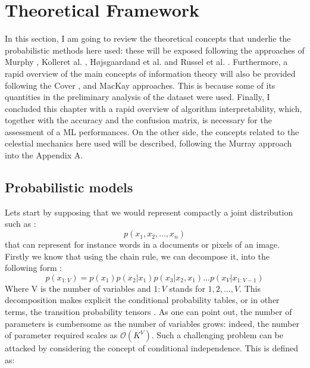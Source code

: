 \documentclass[12pt,%
               a4paper,%
               oneside,openany,%
               titlepage,%
               headinclude,footinclude,%
               BCOR5mm,%
               cleardoublepage=empty,%
               tablecaptionabove,%
               floatperchapter,
               ]{scrreprt}                 %
\begin{document}
 


\chapter{Theoretical Framework}

In this section, I am going to review the theoretical concepts
that underlie the probabilistic methods here used: these will be
exposed following the approaches of Murphy \cite{murphy2012machine} , Kolleret al. \cite{koller2009probabilistic}, Højsgaardand et al. \cite{hojsgaard2012graphical} and Russel et al. \cite{russell2010artificial}. Furthermore, a rapid overview of the main concepts of information theory will also be provided following the Cover \cite{cover2006elements}, and MacKay \cite{mackay2003information} approaches. This is because some of its quantities in the preliminary analysis of the dataset were used. Finally, I concluded this chapter with a rapid overview of algorithm interpretability, which, together with the accuracy and the
confusion matrix, is necessary for the assessment of a ML performances. On the other side, the concepts related to the celestial
mechanics here used will be described, following the Murray
approach \cite{murray1999solar} into the Appendix A.

\section{Probabilistic models}

Lets start by supposing that we would represent compactly a joint distribution such as \cite{murphy2012machine}:
\begin{equation}
p(x_{1},x_{2},...,x_{n})
\end{equation}
that can represent for instance words in a documents or pixels of an image.  Firstly we know that using the chain rule,  we can decompose it, into the following form \cite{murphy2012machine}:
\begin{equation}
p(x_{1:V})=p(x_{1})p(x_{2}|x_{1})p(x_{3}|x_{2},x_{1})...p(x_{V}|x_{1:V-1})
\end{equation}
Where V is the number of variables and $1:V$ stands for ${1,2,...,V}$.  This decomposition makes explicit the conditional probability tables, or in other terms, the transition probability tensors \cite{wu2017markov}.  As one can point out, the number of parameters is cumbersome as the number of variables grows: indeed, the number of parameter required scales as $\mathcal{O}(K^{V})$.  Such a challenging problem can be attacked by considering the concept of conditional independence. This is defined as\cite{murphy2012machine}:
\end{document}
